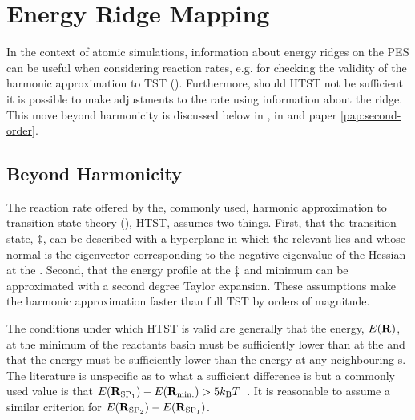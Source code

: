 \section{Energy Ridge Mapping}
\label{sec:energy-ridge-mapping}
In the context of atomic simulations, information about energy ridges on the PES can be useful when considering reaction rates, e.g. for checking the validity of the harmonic approximation to TST ().
Furthermore, should HTST not be sufficient it is possible to make adjustments to the rate using information about the ridge.
This move beyond harmonicity is discussed below in , in  and paper \ref{pap:second-order}.

\subsection{Beyond Harmonicity}
\label{sec:beyond-harmonicity}
The reaction rate offered by the, commonly used, harmonic approximation to transition state theory (), HTST, assumes two things.
First, that the transition state, $\ddagger$, can be described with a hyperplane in which the relevant  lies and whose normal is the eigenvector corresponding to the negative eigenvalue of the Hessian at the .
Second, that the energy profile at the $\ddagger$ and minimum can be approximated with a second degree Taylor expansion.
These assumptions make the harmonic approximation faster than full TST by orders of magnitude.

The conditions under which HTST is valid are generally that the energy, $E({\mathrm{\mathbf{\bm{R}}}})$, at the minimum of the reactants basin must be sufficiently lower than at the  and that the  energy must be sufficiently lower than the energy at any neighbouring s.
The literature is unspecific as to what a sufficient difference is but a commonly used value is that $E({\mathrm{\mathbf{\bm{R}}}}_{\text{SP}_{1}}) - E({\mathrm{\mathbf{\bm{R}}}}_\text{min.}) > 5k_\text{B} T$~\cite{htst-5ev-2005}.
It is reasonable to assume a similar criterion for $E({\mathrm{\mathbf{\bm{R}}}}_{\text{SP}_{2}}) - E({\mathrm{\mathbf{\bm{R}}}}_{\text{SP}_{1}})$.

